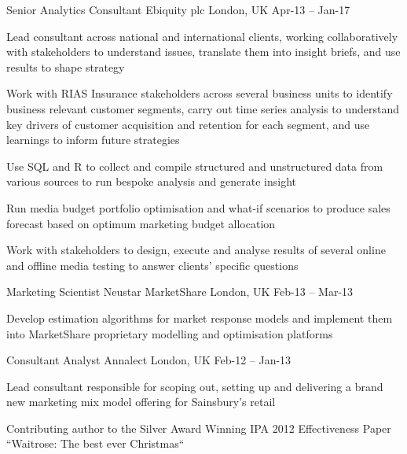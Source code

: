 \begin{cventries}
  \cventry
    {Senior Analytics Consultant} %
    {Ebiquity plc} %
    {London, UK} %
    {Apr-13 – Jan-17} %
    {
      \begin{cvitems} %
        \item {Lead consultant across national and international clients, working collaboratively with stakeholders to understand issues, translate them into insight briefs, and use results to shape strategy}
        \item {Work with RIAS Insurance stakeholders across several business units to identify business relevant customer segments, carry out time series analysis to understand key drivers of customer acquisition and retention for each segment, and use learnings to inform future strategies}
        \item {Use SQL and R to collect and compile structured and unstructured data from various sources to run bespoke analysis and generate insight}
        \item {Run media budget portfolio optimisation and what-if scenarios to produce sales forecast based on optimum marketing budget allocation}
        \item {Work with stakeholders to design, execute and analyse results of several online and offline media testing to answer clients’ specific questions}
      \end{cvitems}
    }

  \cventry
    {Marketing Scientist} %
    {Neustar MarketShare} %
    {London, UK} %
    {Feb-13 – Mar-13} %
    {
      \begin{cvitems} %
        \item {Develop estimation algorithms for market response models and implement them into MarketShare proprietary modelling and optimisation platforms}
      \end{cvitems}
      }
    
  \cventry
    {Consultant Analyst} %
    {Annalect} %
    {London, UK} %
    {Feb-12 – Jan-13} %
    {
      \begin{cvitems} %
        \item {Lead consultant responsible for scoping out, setting up and delivering a brand new marketing mix model offering for Sainsbury’s retail}
        \item {Contributing author to the Silver Award Winning IPA 2012 Effectiveness Paper “Waitrose: The best ever Christmas“}
      \end{cvitems}
    }
    

\end{cventries}
